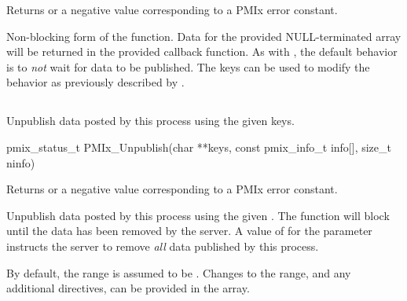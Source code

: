 Returns  or a negative value corresponding to a PMIx error constant.

\descr

Non-blocking form of the  function.
Data for the provided NULL-terminated  array will be returned in the provided callback function.
As with , the default behavior is to \emph{not} wait for data to be published.
The  keys can be used to modify the behavior as previously described by .


\subsection{}

\summary

Unpublish data posted by this process using the given keys.

\format

\cspecificstart
\begin{codepar}
pmix_status_t
PMIx_Unpublish(char **keys,
               const pmix_info_t info[], size_t ninfo)
\end{codepar}
\cspecificend

\begin{arglist}
\end{arglist}

Returns  or a negative value corresponding to a PMIx error constant.

\descr

Unpublish data posted by this process using the given .
The function will block until the data has been removed by the server.
A value of  for the  parameter instructs the server to remove \emph{all} data published by this process.

By default, the range is assumed to be .
Changes to the range, and any additional directives, can be provided in the  array.


\subsection{}


